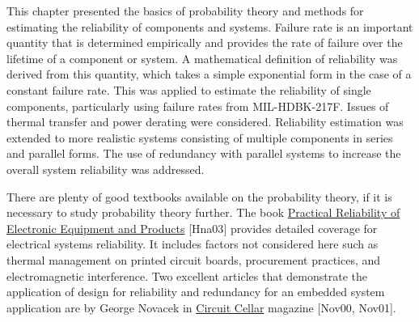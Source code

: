 This chapter presented the basics of probability theory and methods for
estimating the reliability of components and systems. Failure rate is an
important quantity that is determined empirically and provides the rate
of failure over the lifetime of a component or system. A mathematical
definition of reliability was derived from this quantity, which takes a
simple exponential form in the case of a constant failure rate. This was
applied to estimate the reliability of single components, particularly
using failure rates from MIL-HDBK-217F. Issues of thermal transfer and
power derating were considered. Reliability estimation was extended to
more realistic systems consisting of multiple components in series and
parallel forms. The use of redundancy with parallel systems to increase
the overall system reliability was addressed.

There are plenty of good textbooks available on the probability theory,
if it is necessary to study probability theory further. The book
\ul{Practical Reliability of Electronic Equipment and Products}
{[}Hna03{]} provides detailed coverage for electrical systems
reliability. It includes factors not considered here such as thermal
management on printed circuit boards, procurement practices, and
electromagnetic interference. Two excellent articles that demonstrate
the application of design for reliability and redundancy for an embedded
system application are by George Novacek in \ul{Circuit Cellar} magazine
{[}Nov00, Nov01{]}.
